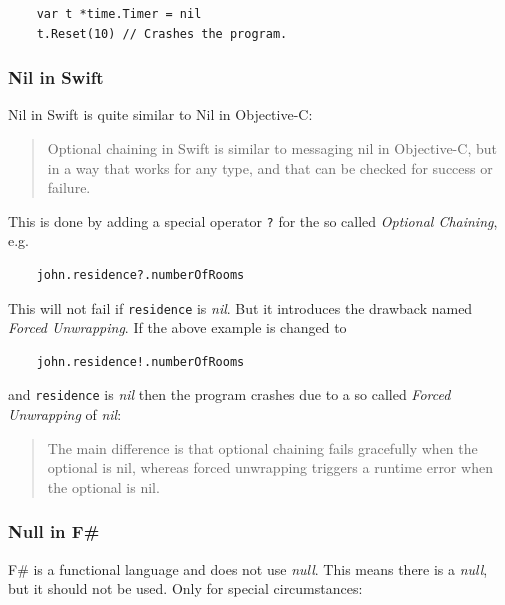 \documentclass[11pt, a4paper]{report}
\begin{document}
\begin{lstlisting}
    var t *time.Timer = nil
    t.Reset(10) // Crashes the program.
\end{lstlisting}

\subsubsection{Nil in Swift}

Nil in Swift is quite similar to Nil in Objective-C:\@

\begin{quotation}
    Optional chaining in Swift is similar to messaging nil in Objective-C, but in a way that works for any type, and that can be checked for success or failure.\cite{swift-spec-optional-chaining}
\end{quotation}

\noindent This is done by adding a special operator \texttt{?} for the so called \textit{Optional Chaining}, e.g.

\begin{lstlisting}
    john.residence?.numberOfRooms
\end{lstlisting}

\noindent This will not fail if \texttt{residence} is \textit{nil}. But it introduces the drawback named \textit{Forced Unwrapping}. If the above example is changed to

\begin{lstlisting}
    john.residence!.numberOfRooms
\end{lstlisting}

\noindent and \texttt{residence} is \textit{nil} then the program crashes due to a so called \textit{Forced Unwrapping} of \textit{nil}:

\begin{quotation}
    The main difference is that optional chaining fails gracefully when the optional is nil, whereas forced unwrapping triggers a runtime error when the optional is nil.\cite{swift-spec-optional-chaining}
\end{quotation}

\subsubsection{Null in F\#}

F\# is a functional language and does not use \textit{null}. This means there is a \textit{null}, but it should not be used. Only for special circumstances:
\end{document}
